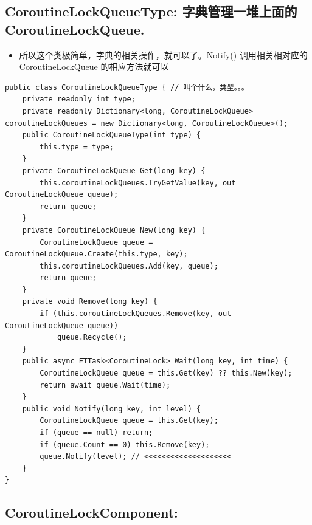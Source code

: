 \documentclass[9pt, b5paper]{article}
\begin{document}
\subsection{CoroutineLockQueueType: 字典管理一堆上面的 CoroutineLockQueue.}
\label{sec-14-4}
\begin{itemize}
\item 所以这个类极简单，字典的相关操作，就可以了。Notify() 调用相关相对应的CoroutineLockQueue 的相应方法就可以
\end{itemize}
\begin{verbatim}
public class CoroutineLockQueueType { // 叫个什么，类型。。。
    private readonly int type;
    private readonly Dictionary<long, CoroutineLockQueue> coroutineLockQueues = new Dictionary<long, CoroutineLockQueue>();
    public CoroutineLockQueueType(int type) {
        this.type = type;
    }
    private CoroutineLockQueue Get(long key) {
        this.coroutineLockQueues.TryGetValue(key, out CoroutineLockQueue queue);
        return queue;
    }
    private CoroutineLockQueue New(long key) {
        CoroutineLockQueue queue = CoroutineLockQueue.Create(this.type, key);
        this.coroutineLockQueues.Add(key, queue);
        return queue;
    }
    private void Remove(long key) {
        if (this.coroutineLockQueues.Remove(key, out CoroutineLockQueue queue)) 
            queue.Recycle();
    }
    public async ETTask<CoroutineLock> Wait(long key, int time) {
        CoroutineLockQueue queue = this.Get(key) ?? this.New(key);
        return await queue.Wait(time);
    }
    public void Notify(long key, int level) {
        CoroutineLockQueue queue = this.Get(key);
        if (queue == null) return;
        if (queue.Count == 0) this.Remove(key);
        queue.Notify(level); // <<<<<<<<<<<<<<<<<<<< 
    }
}
\end{verbatim}
\subsection{CoroutineLockComponent:}
\label{sec-14-5}
\end{document}
